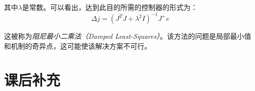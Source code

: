 
其中$\lambda$是常数。可以看出，达到此目的所需的控制器的形式为：
\begin{equation}
\Delta j=(J^TJ+\lambda^2 I)^{-1}J^+e
\end{equation}


这被称为\emph{阻尼最小二乘法（Damped Least-Squares）}。该方法的问题是局部最小值和机制的奇异点，这可能使该解决方案不可行。


\section*{课后补充}


